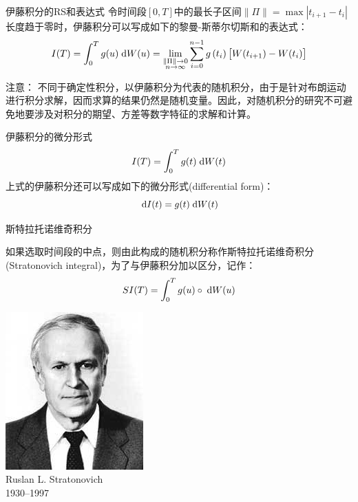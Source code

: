 \documentclass[t]{beamer}
\newcommand{\dif}{{\;\rm d}}
\begin{document}
\begin{frame}{伊藤积分的RS和表达式}
令时间段$[0,T]$中的最长子区间$\|\Pi\|=\max|t_{i+1}-t_{i}|$长度趋于零时，伊藤积分可以写成如下的黎曼-斯蒂尔切斯和的表达式：
\begin{equation*}
I(T)=\int^T_0 g(u)\dif W(u)=\lim_{\substack{\|\Pi\|\to 0 \\ n\to\infty}}\sum^{n-1}_{i=0}g\left(t_i\right)\big[W(t_{i+1})-W(t_{i})\big]
\end{equation*}

\begin{block}{注意：}
不同于确定性积分，以伊藤积分为代表的随机积分，由于是针对布朗运动进行积分求解，因而求算的结果仍然是随机变量。因此，对随机积分的研究不可避免地要涉及对积分的期望、方差等数字特征的求解和计算。
\end{block}
\end{frame}

\begin{frame}{伊藤积分的微分形式}
$$I(T)=\int^T_0 g(t)\dif W(t)$$
上式的伊藤积分还可以写成如下的微分形式(differential form)：
\begin{equation*}
\dif I(t)=g(t)\dif W(t)
\end{equation*}
\end{frame}

\begin{frame}{斯特拉托诺维奇积分}
\begin{multicols}{2}
如果选取时间段的中点，则由此构成的随机积分称作斯特拉托诺维奇积分(Stratonovich integral)，为了与伊藤积分加以区分，记作：
\[SI(T)=\int^T_0 g(u)\circ \dif W(u) \]

\begin{center}
\includegraphics[scale=.5]{fig/Stratonovich.jpg}\\
Ruslan L. Stratonovich\\
1930--1997
\end{center}

\end{multicols}
\end{frame}
\end{document}
